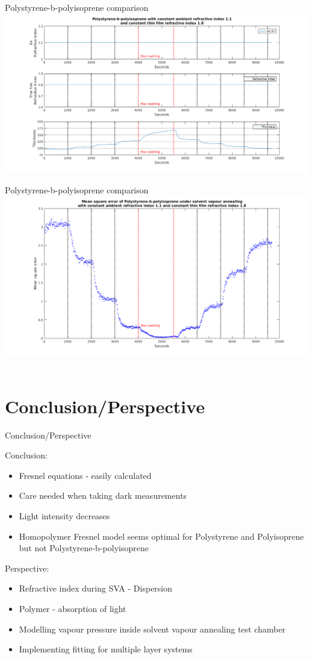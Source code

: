 \documentclass[10pt]{beamer}
\begin{document}
\begin{frame}{Polystyrene-b-polyisoprene comparison}
	\centering
	\includegraphics[width=\textwidth]{PSPIn11n18AVG1.png}
\end{frame}

\begin{frame}{Polystyrene-b-polyisoprene comparison}
	\centering
	\includegraphics[width=\textwidth]{PSPIn11n18AVG2.png}\
\end{frame}

	\section{Conclusion/Perspective}
	
\begin{frame}{Conclusion/Perspective}

Conclusion:
\begin{itemize}
\item Fresnel equations - easily calculated
\item Care needed when taking dark measurements
\item Light intensity decreases
\item Homopolymer Fresnel model seems optimal for Polystyrene and Polyisoprene but not Polystyrene-b-polyisoprene  
\end{itemize}
Perspective:
\begin{itemize}
\item Refractive index during SVA - Dispersion
\item Polymer - absorption of light
\item Modelling vapour pressure inside solvent vapour annealing test chamber
\item Implementing fitting for multiple layer systems
\end{itemize}

\end{frame}
\end{document}
